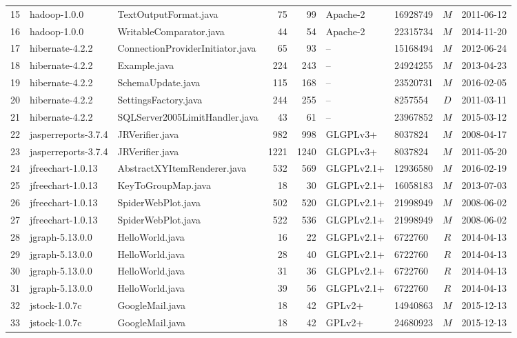 \documentclass{sig-alternate-05-2015}
\begin{document}
\begin{table}
\begin{tabular}{r|l|p{4.5cm}|r|r|l|l|c|l}
			15 & hadoop-1.0.0  & TextOutputFormat.java  & 75 & 99 & Apache-2 & 16928749 & $M$  & 2011-06-12 \\
			16 & hadoop-1.0.0  & WritableComparator.java  & 44 & 54 & Apache-2 & 22315734 & $M$  & 2014-11-20 \\
			17 & hibernate-4.2.2  & ConnectionProviderInitiator.java  & 65 & 93 & -- & 15168494 & $M$  & 2012-06-24 \\
			18 & hibernate-4.2.2  & Example.java  & 224 & 243 & -- & 24924255 & $M$  & 2013-04-23 \\
			19 & hibernate-4.2.2  & SchemaUpdate.java  & 115 & 168 & -- & 23520731 & $M$  & 2016-02-05 \\
			20 & hibernate-4.2.2  & SettingsFactory.java  & 244 & 255 & -- & 8257554 & $D$  & 2011-03-11 \\
			21 & hibernate-4.2.2  & SQLServer2005LimitHandler.java  & 43 & 61 & -- & 23967852 & $M$  & 2015-03-12 \\
			22 & jasperreports-3.7.4  & JRVerifier.java  & 982 & 998 & GLGPLv3+ & 8037824 & $M$  & 2008-04-17 \\
			23 & jasperreports-3.7.4  & JRVerifier.java  & 1221 & 1240 & GLGPLv3+ & 8037824 & $M$  & 2011-05-20 \\
			24 & jfreechart-1.0.13  & AbstractXYItemRenderer.java  & 532 & 569 & GLGPLv2.1+ & 12936580 & $M$  & 2016-02-19 \\
			25 & jfreechart-1.0.13  & KeyToGroupMap.java  & 18 & 30 & GLGPLv2.1+ & 16058183 & $M$  & 2013-07-03 \\
			26 & jfreechart-1.0.13  & SpiderWebPlot.java  & 502 & 520 & GLGPLv2.1+ & 21998949 & $M$  & 2008-06-02 \\
			27 & jfreechart-1.0.13  & SpiderWebPlot.java  & 522 & 536 & GLGPLv2.1+ & 21998949 & $M$  & 2008-06-02 \\
			28 & jgraph-5.13.0.0  & HelloWorld.java  & 16 & 22 & GLGPLv2.1+ & 6722760 & $R$  & 2014-04-13 \\
			29 & jgraph-5.13.0.0  & HelloWorld.java  & 28 & 40 & GLGPLv2.1+ & 6722760 & $R$  & 2014-04-13 \\
			30 & jgraph-5.13.0.0  & HelloWorld.java  & 31 & 36 & GLGPLv2.1+ & 6722760 & $R$  & 2014-04-13 \\
			31 & jgraph-5.13.0.0  & HelloWorld.java  & 39 & 56 & GLGPLv2.1+ & 6722760 & $R$  & 2014-04-13 \\
			32 & jstock-1.0.7c  & GoogleMail.java  & 18 & 42 & GPLv2+ & 14940863 & $M$  & 2015-12-13 \\
			33 & jstock-1.0.7c  & GoogleMail.java  & 18 & 42 & GPLv2+ & 24680923 & $M$  & 2015-12-13 \\

\end{tabular}
\end{table}
\end{document}
